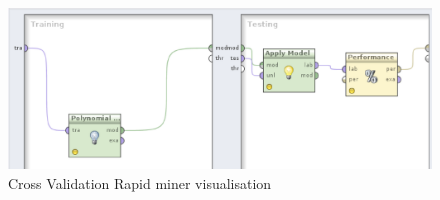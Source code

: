 \begin{figure}[!hbp]
\begin{center}
    \includegraphics[scale=0.5]{rapidMiner-process-validation}
\caption{\label{pic:st_art}  Cross Validation Rapid miner visualisation}
\end{center}
\end{figure}

